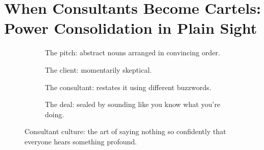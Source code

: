 \section{When Consultants Become Cartels: Power Consolidation in Plain Sight}

\begin{figure}[H]
  \centering
  
  \begin{subfigure}[t]{0.45\textwidth}
  \centering
  \caption*{The pitch: abstract nouns arranged in convincing order.}
  \end{subfigure}
  \hfill
  \begin{subfigure}[t]{0.45\textwidth}
  \centering
  \caption*{The client: momentarily skeptical.}
  \end{subfigure}
  
  \vspace{1em}
  
  \begin{subfigure}[t]{0.45\textwidth}
  \centering
  \caption*{The consultant: restates it using different buzzwords.}
  \end{subfigure}
  \hfill
  \begin{subfigure}[t]{0.45\textwidth}
  \centering
  \caption*{The deal: sealed by sounding like you know what you’re doing.}
  \end{subfigure}
  
  \caption*{Consultant culture: the art of saying nothing so confidently that everyone hears something profound.}
  \end{figure}



